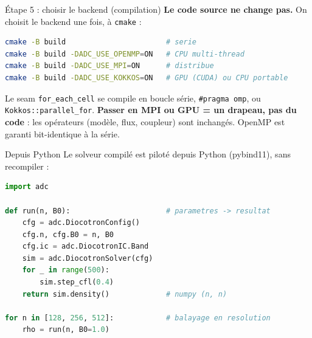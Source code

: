 \documentclass[11pt,aspectratio=169]{beamer}
\begin{document}
\begin{frame}[fragile]{Étape 5 : choisir le backend (compilation)}
\textbf{Le code source ne change pas.} On choisit le backend une fois, à \texttt{cmake} :

\begin{lstlisting}[language=bash, basicstyle=\ttfamily\small,
  keywordstyle=\color{kw}, morekeywords={cmake}]
cmake -B build                       # serie
cmake -B build -DADC_USE_OPENMP=ON   # CPU multi-thread
cmake -B build -DADC_USE_MPI=ON      # distribue
cmake -B build -DADC_USE_KOKKOS=ON   # GPU (CUDA) ou CPU portable
\end{lstlisting}

\vspace{0.5em}
Le seam \texttt{for\_each\_cell} se compile en boucle série, \texttt{\#pragma omp},
ou \texttt{Kokkos::parallel\_for}. \textbf{Passer en MPI ou GPU = un drapeau, pas du
code} : les opérateurs (modèle, flux, coupleur) sont inchangés. OpenMP est garanti
bit-identique à la série.
\end{frame}

\begin{frame}[fragile]{Depuis Python}
Le solveur compilé est piloté depuis Python (pybind11), sans recompiler :

\begin{lstlisting}[language=Python, basicstyle=\ttfamily\footnotesize,
  keywordstyle=\color{kw}\bfseries, morekeywords={import,for,in,def,return}]
import adc

def run(n, B0):                      # parametres -> resultat
    cfg = adc.DiocotronConfig()
    cfg.n, cfg.B0 = n, B0
    cfg.ic = adc.DiocotronIC.Band
    sim = adc.DiocotronSolver(cfg)
    for _ in range(500):
        sim.step_cfl(0.4)
    return sim.density()             # numpy (n, n)

for n in [128, 256, 512]:            # balayage en resolution
    rho = run(n, B0=1.0)
\end{lstlisting}
\end{frame}
\end{document}
